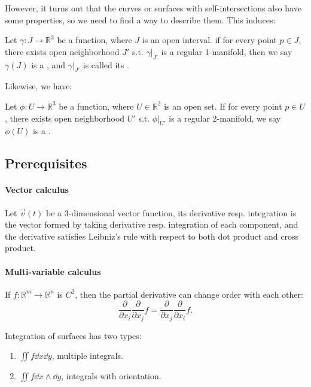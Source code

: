 However, it turns out that the curves or surfaces with self-intersections also have some
properties, so we need to find a way to describe them. This induces:

\begin{definition}
	Let $\gamma: J\to \mathbb{R}^3$ be a function, where $J$ is an open interval.
	if for every point $p\in J$, there exists open neighborhood  $J'$ s.t.
	$\gamma\big|_{J'}$ is a regular 1-manifold, then we say $\gamma(J)$
	is a , and  $\gamma\big|_{J'}$ is
	called its .
\end{definition}
Likewise, we have:
\begin{definition}
	Let $\phi:U\to \mathbb{R}^3$ be a function, where $U\in \mathbb{R}^2$ is an open set.
	If for every point $p\in U$, there exists open neighborhood  $U'$ s.t.
	$\phi\big|_{U'}$ is a regular 2-manifold, we say $\phi(U)$ is
	a .
\end{definition}

\subsection{Prerequisites}
\label{sub:Prerequisites}
\paragraph{Vector calculus}
Let $\vec{v}(t)$ be a 3-dimensional vector function,
its derivative resp. integration is the vector formed by taking
derivative resp. integration of each component,
and the derivative satisfies Leibniz's rule with respect to both dot product
and cross product.

\paragraph{Multi-variable calculus}
If $f: \mathbb{R}^m\to \mathbb{R}^n$ is $C^2$, then the partial derivative
can change order with each other:
 \[
	\frac{\partial}{\partial x_i} \frac{\partial}{\partial x_j} f =
	\frac{\partial}{\partial x_j} \frac{\partial}{\partial x_i} f.
\]

Integration of surfaces has two types:
\begin{enumerate}
	\item $\iint f \dd x\dd y$, multiple integrals.
	\item $\iint f \dd x\wedge \dd y$, integrals with orientation.
\end{enumerate}
